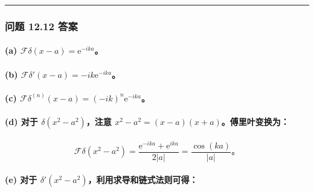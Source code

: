 \begin{center}\rule{0.5\linewidth}{0.5pt}\end{center}

\subsubsection{问题 12.12 答案}\label{ux95eeux9898-12.12-ux7b54ux6848}

\paragraph{\texorpdfstring{(a)
\(\mathcal{F}\delta(x-a) = \mathrm{e}^{-i k a}\)。}{(a) \textbackslash mathcal\{F\}\textbackslash delta(x-a) = \textbackslash mathrm\{e\}\^{}\{-i k a\}。}}\label{a-mathcalfdeltax-a-mathrme-i-k-a}

\paragraph{\texorpdfstring{(b)
\(\mathcal{F}\delta'(x-a) = -i k \mathrm{e}^{-i k a}\)。}{(b) \textbackslash mathcal\{F\}\textbackslash delta\textquotesingle(x-a) = -i k \textbackslash mathrm\{e\}\^{}\{-i k a\}。}}\label{b-mathcalfdeltax-a--i-k-mathrme-i-k-a}

\paragraph{\texorpdfstring{(c)
\(\mathcal{F}\delta^{(n)}(x-a) = (-i k)^n \mathrm{e}^{-i k a}\)。}{(c) \textbackslash mathcal\{F\}\textbackslash delta\^{}\{(n)\}(x-a) = (-i k)\^{}n \textbackslash mathrm\{e\}\^{}\{-i k a\}。}}\label{c-mathcalfdeltanx-a--i-kn-mathrme-i-k-a}

\paragraph{\texorpdfstring{(d) 对于 \(\delta(x^2-a^2)\)，注意
\(x^2-a^2 = (x-a)(x+a)\)。傅里叶变换为：}{(d) 对于 \textbackslash delta(x\^{}2-a\^{}2)，注意 x\^{}2-a\^{}2 = (x-a)(x+a)。傅里叶变换为：}}\label{d-ux5bf9ux4e8e-deltax2-a2ux6ce8ux610f-x2-a2-x-axaux5085ux91ccux53f6ux53d8ux6362ux4e3a}

\[
\mathcal{F}\delta(x^2-a^2) = \frac{\mathrm{e}^{-i k a} + \mathrm{e}^{i k a}}{2|a|} = \frac{\cos(k a)}{|a|}。
\]

\paragraph{\texorpdfstring{(e) 对于
\(\delta'(x^2-a^2)\)，利用求导和链式法则可得：}{(e) 对于 \textbackslash delta\textquotesingle(x\^{}2-a\^{}2)，利用求导和链式法则可得：}}\label{e-ux5bf9ux4e8e-deltax2-a2ux5229ux7528ux6c42ux5bfcux548cux94feux5f0fux6cd5ux5219ux53efux5f97}

